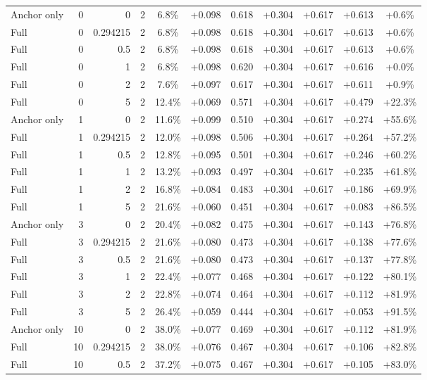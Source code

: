 \begin{table}[htbp]
\begin{tabular}{lrrrccccccc}
Anchor only & 0 & 0 & 2 & 6.8\% & +0.098 & 0.618 & +0.304 & +0.617 & +0.613 & +0.6\% \\
Full & 0 & 0.294215 & 2 & 6.8\% & +0.098 & 0.618 & +0.304 & +0.617 & +0.613 & +0.6\% \\
Full & 0 & 0.5 & 2 & 6.8\% & +0.098 & 0.618 & +0.304 & +0.617 & +0.613 & +0.6\% \\
Full & 0 & 1 & 2 & 6.8\% & +0.098 & 0.620 & +0.304 & +0.617 & +0.616 & +0.0\% \\
Full & 0 & 2 & 2 & 7.6\% & +0.097 & 0.617 & +0.304 & +0.617 & +0.611 & +0.9\% \\
Full & 0 & 5 & 2 & 12.4\% & +0.069 & 0.571 & +0.304 & +0.617 & +0.479 & +22.3\% \\
Anchor only & 1 & 0 & 2 & 11.6\% & +0.099 & 0.510 & +0.304 & +0.617 & +0.274 & +55.6\% \\
Full & 1 & 0.294215 & 2 & 12.0\% & +0.098 & 0.506 & +0.304 & +0.617 & +0.264 & +57.2\% \\
Full & 1 & 0.5 & 2 & 12.8\% & +0.095 & 0.501 & +0.304 & +0.617 & +0.246 & +60.2\% \\
Full & 1 & 1 & 2 & 13.2\% & +0.093 & 0.497 & +0.304 & +0.617 & +0.235 & +61.8\% \\
Full & 1 & 2 & 2 & 16.8\% & +0.084 & 0.483 & +0.304 & +0.617 & +0.186 & +69.9\% \\
Full & 1 & 5 & 2 & 21.6\% & +0.060 & 0.451 & +0.304 & +0.617 & +0.083 & +86.5\% \\
Anchor only & 3 & 0 & 2 & 20.4\% & +0.082 & 0.475 & +0.304 & +0.617 & +0.143 & +76.8\% \\
Full & 3 & 0.294215 & 2 & 21.6\% & +0.080 & 0.473 & +0.304 & +0.617 & +0.138 & +77.6\% \\
Full & 3 & 0.5 & 2 & 21.6\% & +0.080 & 0.473 & +0.304 & +0.617 & +0.137 & +77.8\% \\
Full & 3 & 1 & 2 & 22.4\% & +0.077 & 0.468 & +0.304 & +0.617 & +0.122 & +80.1\% \\
Full & 3 & 2 & 2 & 22.8\% & +0.074 & 0.464 & +0.304 & +0.617 & +0.112 & +81.9\% \\
Full & 3 & 5 & 2 & 26.4\% & +0.059 & 0.444 & +0.304 & +0.617 & +0.053 & +91.5\% \\
Anchor only & 10 & 0 & 2 & 38.0\% & +0.077 & 0.469 & +0.304 & +0.617 & +0.112 & +81.9\% \\
Full & 10 & 0.294215 & 2 & 38.0\% & +0.076 & 0.467 & +0.304 & +0.617 & +0.106 & +82.8\% \\
Full & 10 & 0.5 & 2 & 37.2\% & +0.075 & 0.467 & +0.304 & +0.617 & +0.105 & +83.0\% \\

\end{tabular}
\end{table}
